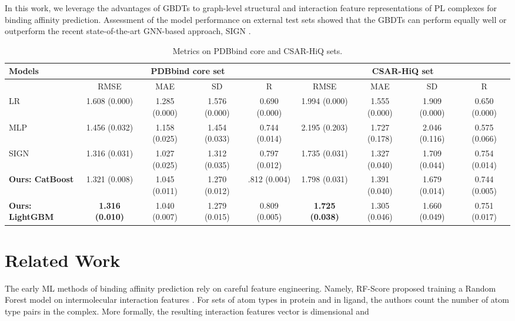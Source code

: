 \documentclass[nohyperref]{article}
\theoremstyle{plain}
\theoremstyle{definition}
\theoremstyle{remark}
\begin{document}
In this work, we leverage the advantages of GBDTs to graph-level structural and interaction feature representations of PL complexes for binding affinity prediction. Assessment of the model performance on external test sets showed that the GBDTs can perform equally well or outperform the recent state-of-the-art GNN-based approach, SIGN \cite{sign}.
\begin{table*}[t]
    \caption{Metrics on PDBbind core and CSAR-HiQ sets.}
    \label{tab:metrics}
    \footnotesize
    \centering
    \begin{tabular}{@{}lcccccccc@{}}
        \toprule
        \multirow{2}{*}[-1em]{Models} & \multicolumn{4}{c|}{PDBbind core set} & \multicolumn{4}{c}{CSAR-HiQ set}\\
\midrule
        {} & RMSE  & MAE  & SD  & R  & RMSE  & MAE  & SD  & R \\
        \midrule
        LR & 1.608 (0.000) & 1.285 (0.000) & 1.576 (0.000) & 0.690 (0.000) & 1.994 (0.000) & 1.555 (0.000) & 1.909 (0.000) & 0.650 (0.000) \\
        
        MLP & 1.456 (0.032) & 1.158 (0.025) & 1.454 (0.033) & 0.744 (0.014) & 2.195 (0.203) & 1.727 (0.178) & 2.046 (0.116) & 0.575 (0.066) \\

        SIGN & 1.316 (0.031) & 1.027 (0.025) &  1.312 (0.035) & 0.797 (0.012) & 1.735 (0.031) & 1.327 (0.040) & 1.709 (0.044) & 0.754 (0.014) \\
        \hline
        \textbf{Ours: CatBoost} & 1.321 (0.008) & 1.045 (0.011) & 1.270 (0.012) & .812 (0.004) & 1.798 (0.031) & 1.391 (0.040) & 1.679 (0.014) & 0.744 (0.005) \\
        
        \textbf{Ours: LightGBM} & \textbf{1.316 (0.010)} & 1.040 (0.007) & 1.279 (0.015) & 0.809 (0.005) & \textbf{1.725 (0.038)} & 1.305 (0.046) & 1.660 (0.049) & 0.751 (0.017) \\
        \bottomrule
    \end{tabular}
\end{table*}

\section{Related Work}
The early ML methods of binding affinity prediction rely on careful feature engineering. Namely, RF-Score proposed training a Random Forest model on intermolecular interaction features \cite{mlfeatures}. For sets of atom types  in protein and  in ligand, the authors count the number of atom type pairs in the complex. More formally, the resulting interaction features vector  is  dimensional and 
\end{document}

